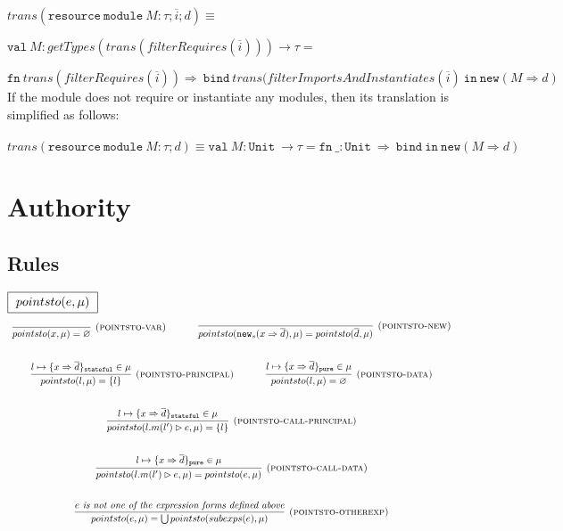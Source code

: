 \documentclass{llncs}
\newcommand{\keywadj}[1]{\mathtt{#1}}
\newcommand{\keyw}[1]{\keywadj{#1}~}
\begin{document}
\noindent$trans(\keyw{resource} \keyw{module} M : \tau; \overline{i}; d) \equiv$

$\keyw{val} M : getTypes(trans(filterRequires(\overline{i}))) \rightarrow \tau = $

$\keyw{fn} trans(filterRequires(\overline{i})) \Rightarrow~\keyw{bind} trans(filterImportsAndInstantiates(\overline{i})~\keyw{in} \keywadj{new}(M \Rightarrow d)$\\

\noindent If the module does not require or instantiate any modules, then its translation is simplified as follows:
\\\\
\noindent$trans(\keyw{resource} \keyw{module} M : \tau; d) \equiv \keyw{val} M : \keyw{Unit} \rightarrow \tau = \keyw{fn} \_ : \keyw{Unit} \Rightarrow~\keyw{bind} \keyw{in} \keywadj{new}(M \Rightarrow d)$


\newpage

\section{Authority}

\subsection{Rules}

$\fbox{$~pointsto(e, \mu)~$}$
\[
\begin{array}{c}
\infer[\textsc{(pointsto-var)}]
  {pointsto(x,\mu) = \varnothing }
  {}%
~~~~~~~~~~
\infer[\textsc{(pointsto-new)}]
  {pointsto(\keywadj{new}_{s}(x \Rightarrow \overline{d}),\mu) = pointsto(\overline{d},\mu) }
  {}\\[5ex]

\infer[\textsc{(pointsto-principal)}]
  {pointsto(l,\mu) = \{ l \}}
  {l \mapsto \{ x \Rightarrow \overline{d} \}_\keywadj{stateful} \in \mu}%
~~~~~~~~~~
\infer[\textsc{(pointsto-data)}]
  {pointsto(l,\mu) = \varnothing }
  {l \mapsto \{ x \Rightarrow \overline{d} \}_\keywadj{pure} \in \mu}\\[5ex]

\infer[\textsc{(pointsto-call-principal)}]
  {pointsto(l.m(l') \rhd e,\mu) = \{l\} }
  {l \mapsto \{ x \Rightarrow \overline{d} \}_\keywadj{stateful} \in \mu}\\[5ex]

\infer[\textsc{(pointsto-call-data)}]
  {pointsto(l.m(l') \rhd e,\mu) = pointsto(e,\mu)}
  {l \mapsto \{ x \Rightarrow \overline{d} \}_\keywadj{pure} \in \mu}\\[5ex]

\infer[\textsc{(pointsto-otherexp)}]
  {pointsto(e,\mu) = \bigcup pointsto(subexps(e),\mu) }
  {\textit{$e$ is not one of the expression forms defined above}}\\[5ex]

\end{array}
\]
\end{document}
